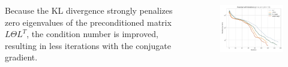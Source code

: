 \documentclass{beamer}                             %
\begin{document}
\begin{frame}[t]
\begin{columns}[T]
\begin{column}{0.30\textwidth}
\begin{tcolorbox}
    \begin{columns}
      \begin{column}{0.5\textwidth}
        Because the KL divergence strongly penalizes zero eigenvalues of the
        preconditioned matrix \( L \Theta L^T \), the condition number is
        improved, resulting in less iterations with the conjugate gradient.
      \end{column}
      \begin{column}{0.5\textwidth}
        \begin{figure}[h!]
          \centering
          \includegraphics[width=\textwidth]{data/n_iter-res.png}
        \end{figure}
      \end{column}
    \end{columns}
  \end{tcolorbox}

\end{column}

\end{columns}


\end{frame}
\end{document}
